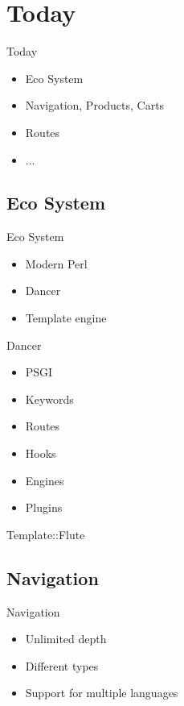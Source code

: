 \section{Today}
\begin{frame}{Today}
\begin{itemize}
\item Eco System
\item Navigation, Products, Carts
\item Routes
\item ...
\end{itemize}
\end{frame}

\subsection{Eco System}

\begin{frame}{Eco System}
\begin{itemize}
\item Modern Perl
\item Dancer
\item Template engine
\end{itemize}
\end{frame}

\begin{frame}{Dancer}
\begin{itemize}
\item PSGI
\item Keywords
\item Routes
\item Hooks
\item Engines
\item Plugins
\end{itemize}
\end{frame}


\begin{frame}{Template::Flute}
\end{frame}

\subsection{Navigation}
\begin{frame}{Navigation}
\begin{itemize}
\item Unlimited depth
\item Different types
\item Support for multiple languages
\end{itemize}
\end{frame}

